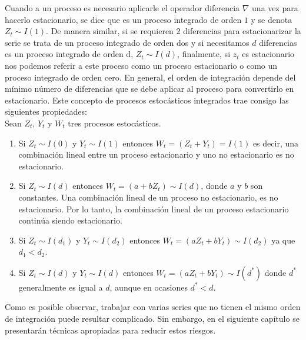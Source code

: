 Cuando a un proceso es necesario aplicarle el operador diferencia $\nabla$  una vez para hacerlo estacionario, se dice que es un proceso integrado de orden $1$ y se denota $Z_t \sim I(1)$. De manera similar, si se requieren $2$ diferencias para estacionarizar la serie se trata de un proceso integrado de orden dos y si necesitamos $d$ diferencias es un proceso integrado de orden d,  $Z_t \sim I(d)$, finalmente, si $z_t$ es estacionario nos podemos referir a este proceso como un proceso estacionario o como un proceso integrado de orden cero. En general, el orden de integración depende del mínimo número de diferencias que se debe aplicar al proceso para convertirlo en estacionario. Este concepto de procesos estocásticos integrados trae consigo las siguientes propiedades:\\

Sean $Z_t$, $Y_t$ y $W_t$ tres procesos estocásticos.

\begin{enumerate}%

\item
 Si $Z_t \sim I(0)$ y  $Y_t \sim I(1)$ entonces $W_t=(Z_t+Y_t) = I(1)$ es decir, una combinación lineal entre un proceso estacionario y uno no estacionario es no estacionario.

\item
Si $Z_t \sim I(d)$ entonces $W_t=(a+bZ_t) \sim I(d)$, donde $a$ y $b$ son constantes. Una combinación lineal de un proceso no estacionario, es no estacionario. Por lo tanto, la combinación lineal de un proceso estacionario continúa siendo estacionario.

\item 
Si $Z_t \sim I(d_1)$ y $Y_t \sim I(d_2)$ entonces $W_t=(aZ_t+bY_t) \sim I(d_2)$ ya que $d_1<d_2$.

\item
Si $Z_t \sim I(d)$  y $Y_t \sim I(d)$ entonces $W_t=(aZ_t+bY_t) \sim I(d^*)$ donde $d^*$ generalmente es igual a $d$, aunque en ocasiones $d^* < d$. 

\end{enumerate}

Como es posible observar, trabajar con varias series que no tienen el mismo orden de integración puede resultar complicado. Sin embargo, en el siguiente capítulo se presentarán técnicas apropiadas para reducir estos riesgos. 



